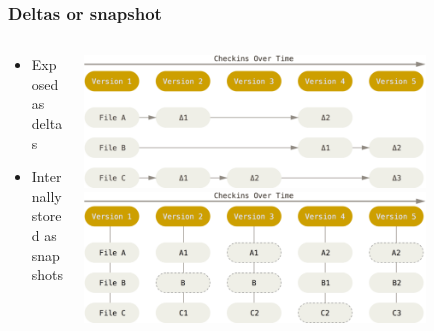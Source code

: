 \documentclass[hyperref={pdfpagelabels=false}]{beamer}
\begin{document}
\begin{frame}
\frametitle{Deltas or snapshot}
\begin{columns}
\begin{column}{0.3\textwidth}
	\begin{itemize}
		\item Exposed as deltas
		\vspace{0.1\textheight}
		\item Internally stored as snapshots
	\end{itemize}
\end{column}
\begin{column}{0.7\textwidth}  %
	\begin{center}
    \includegraphics[width=0.8\textwidth]{deltas}
    \vspace{2em}
    \includegraphics[width=0.8\textwidth]{snapshots}
    \end{center}
\end{column}
\end{columns}
\end{frame}
\end{document}
